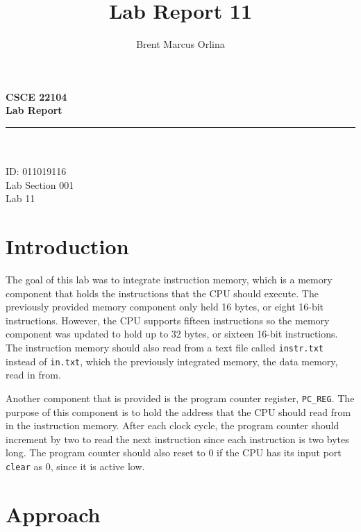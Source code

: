 \documentclass[11pt]{report}
\makeatletter
\newcommand{\@labsection}{000}
\newcommand{\labsection}[1]{
    \renewcommand{\@labsection}{#1}
}
\newcommand{\@labnumber}{0}
\newcommand{\labnumber}[1]{
    \renewcommand{\@labnumber}{#1}
}
\newcommand{\@shortsubmitted}{1/1/70}
\newcommand{\shortsubmitted}[1]{
    \renewcommand{\@shortsubmitted}{#1}
}
\renewcommand{\maketitle}{
    \newgeometry{left=1in, right=1in, top=1.75in, textheight=8.25in}
    \singlespacing
    \begin{center}
        {\huge \bf CSCE 22104} \\
        \vspace{2.5em}
        {\Large \bf Lab Report} \\
        \vspace{2em}
        \noindent\rule{20em}{0.4pt} \\
        \vspace{1em}
        {\Large \@author} \\
        \vspace{.75em}
        {\normalsize ID: 011019116} \\
        \vspace{.75em}
        {\normalsize Lab Section \@labsection} \\
        \vspace{.75em}
        {\normalsize Lab \@labnumber} \\
    \end{center}
    \newpage
    \restoregeometry
}
\makeatother
\begin{document}
\title{Lab Report 11}
\author{Brent Marcus Orlina}

\labsection{001}
\labnumber{11}

\shortsubmitted{4/30/25}

\maketitle

\section*{Introduction}
The goal of this lab was to integrate instruction memory, which is a memory component that holds the
instructions that the CPU should execute. The previously provided memory component only held 16
bytes, or eight 16-bit instructions. However, the CPU supports fifteen instructions so the memory
component was updated to hold up to 32 bytes, or sixteen 16-bit instructions. The instruction memory
should also read from a text file called \verb|instr.txt| instead of \verb|in.txt|, which the
previously integrated memory, the data memory, read in from.

Another component that is provided is the program counter register, \verb|PC_REG|. The purpose of
this component is to hold the address that the CPU should read from in the instruction memory. After
each clock cycle, the program counter should increment by two to read the next instruction since
each instruction is two bytes long. The program counter should also reset to 0 if the CPU has its
input port \verb|clear| as 0, since it is active low.

\section*{Approach}

\end{document}
